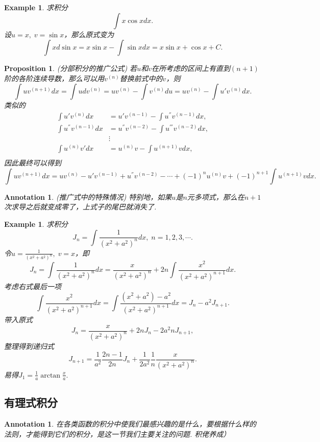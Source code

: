 \documentclass{article}
\newtheorem{proposition}[theorem]{Proposition}
\newtheorem{example}[theorem]{Example}
\newtheorem{annotation}[theorem]{Annotation}
\begin{document}
\begin{example}
\rm 求积分
$$
\int x\cos xdx.
$$
设$u=x,\; v= \sin x$，那么原式变为
$$
\int xd\sin x = x\sin x - \int \sin x dx = x\sin x +\cos x + C.
$$
\end{example}


\begin{proposition}
\rm {\color{red} (分部积分的推广公式)} 若$u$和$v$在所考虑的区间上有直到$(n+1)$阶的各阶连续导数，那么可以用$v^{(n)}$替换前式中的$v$，则
$$
\int uv^{(n+1)}dx = \int udv^{(n)} = uv^{(n)} - \int v^{(n)}du = uv^{(n)} - \int u'v^{(n)}dx.
$$
类似的
$$
\begin{array}{ll}
\int u'v^{(n)}dx &= u'v^{(n-1)} - \int u^{''}v^{(n-1)}dx, \\
\int u^{''}v^{(n-1)}dx &= u^{''}v^{(n-2)} - \int u^{'''}v^{(n-2)}dx, \\
&\vdots \\
\int u^{(n)}v'dx &= u^{(n)}v - \int u^{(n+1)}vdx, \\
\end{array}
$$
因此最终可以得到
$$
\int uv^{(n+1)}dx = uv^{(n)} - u'v^{(n-1)} + u^{''}v^{(n-2)} -\cdots + (-1)^{n} u^{(n)}v +  (-1)^{n+1} \int u^{(n+1)}vdx.
$$
\end{proposition}

\begin{annotation}
\rm {\color{red} (推广式中的特殊情况) }特别地，如果$u$是$n$元多项式，那么在$n+1$次求导之后就变成零了，上式子的尾巴就消失了.
\end{annotation}

\begin{example}
\rm 求积分
$$
J_n = \int \frac{1}{(x^2+a^2)^n}dx,\; n =1,2,3,\cdots.
$$
令$u=\frac{1}{(x^2+a^2)^n},\; v = x$，即
$$
J_n = \int \frac{1}{(x^2+a^2)^n}dx = \frac{x}{(x^2+a^2)^n} + 2n \int \frac{x^2}{(x^2+a^2)^{n+1}}dx. 
$$
考虑右式最后一项
$$
\int \frac{x^2}{(x^2+a^2)^{n+1}}dx =\int \frac{(x^2+a^2) - a^2}{(x^2+a^2)^{n+1}}dx = J_n - a^2 J_{n+1}.
$$
带入原式
$$
J_n = \frac{x}{(x^2+a^2)^n}+2nJ_n - 2a^2nJ_{n+1},
$$
整理得到{\color{red}递归式}
$$
J_{n+1} = \frac{1}{a^2}\frac{2n-1}{2n}J_n + \frac{1}{2a^2}\frac{1}{n}\frac{x}{(x^2+a^2)^n}.
$$
易得$J_1 = \frac{1}{a} \arctan \frac{x}{a}.$ 
\end{example}

\subsection{有理式积分}

\begin{annotation}
\rm 在各类函数的积分中使我们{\color{red}最感兴趣的是什么}，要根据什么样的{\color{red}法则}，才能得到它们的积分，是这一节我们主要关注的问题. 积佬养成）
\end{annotation}
\end{document}
